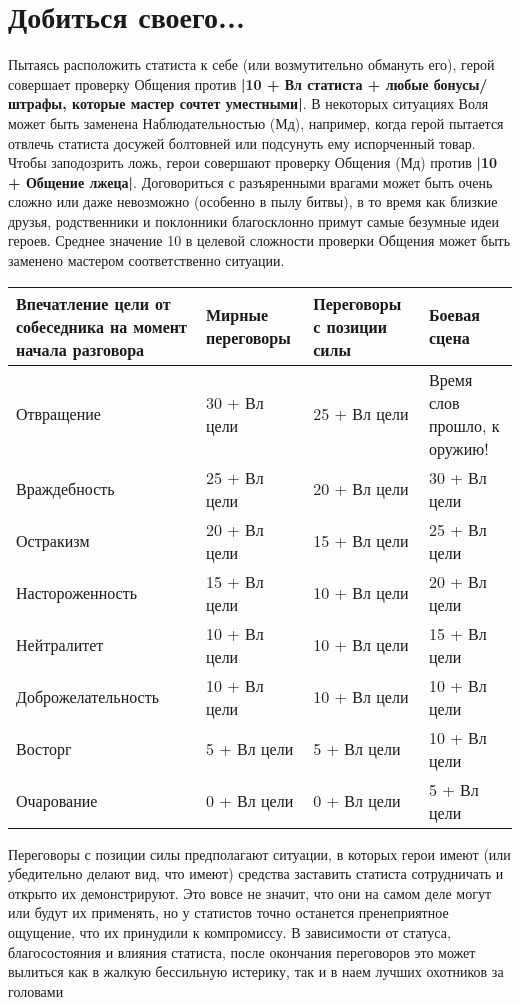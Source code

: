 \section{Добиться своего...}
Пытаясь расположить статиста к себе (или возмутительно обмануть его), герой совершает проверку Общения против \textbf{|10 + Вл статиста + любые бонусы/штрафы, которые мастер сочтет уместными|}. В некоторых ситуациях Воля может быть заменена Наблюдательностью (Мд), например, когда герой пытается отвлечь статиста досужей болтовней или подсунуть ему испорченный товар. Чтобы заподозрить ложь, герои совершают проверку Общения (Мд) против \textbf{|10 + Общение лжеца|}. Договориться с разъяренными врагами может быть очень сложно или даже невозможно (особенно в пылу битвы), в то время как близкие друзья, родственники и поклонники благосклонно примут самые безумные идеи героев. Среднее значение 10 в целевой сложности проверки Общения может быть заменено мастером соответственно ситуации.

\begin{center}
\begin{tabular}{|p{6cm}|p{3cm}|p{2.5cm}|p{2.5cm}|}
\hline
Впечатление цели от собеседника на момент начала разговора & Мирные переговоры & Переговоры с позиции силы & Боевая сцена \\ \hline
Отвращение & 30 + Вл цели & 25 + Вл цели & Время слов прошло, к оружию! \\ \hline
Враждебность & 25 + Вл цели & 20 + Вл цели & 30 + Вл цели \\ \hline
Остракизм & 20 + Вл цели & 15 + Вл цели & 25 + Вл цели \\ \hline
Настороженность & 15 + Вл цели & 10 + Вл цели & 20 + Вл цели \\ \hline
Нейтралитет & 10 + Вл цели & 10 + Вл цели & 15 + Вл цели \\ \hline
Доброжелательность & 10 + Вл цели & 10 + Вл цели & 10 + Вл цели \\ \hline
Восторг & 5 + Вл цели & 5 + Вл цели & 10 + Вл цели \\ \hline
Очарование & 0 + Вл цели & 0 + Вл цели & 5 + Вл цели \\ \hline
\end{tabular}
\end{center}
Переговоры с позиции силы предполагают ситуации, в которых герои имеют (или убедительно делают вид, что имеют) средства заставить статиста сотрудничать и открыто их демонстрируют. Это вовсе не значит, что они на самом деле могут или будут их применять, но у статистов точно останется пренеприятное ощущение, что их принудили к компромиссу. В зависимости от статуса, благосостояния и влияния статиста, после окончания переговоров это может вылиться как в жалкую бессильную истерику, так и в наем лучших охотников за головами
